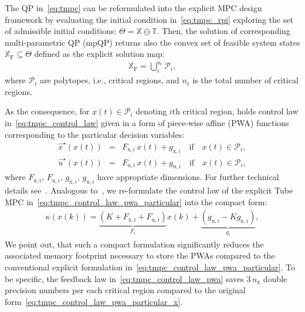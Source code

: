 \documentclass[letterpaper, 10 pt, conference]{ieeeconf}
\begin{document}
The QP in~\eqref{eq:tmpc} can be reformulated into the explicit MPC design framework by evaluating the initial condition in~\eqref{eq:tmpc_rpi} exploring the set of admissible initial conditions: $\Theta = \mathbb{X} \ominus \mathbb{T}$. Then, the solution of corresponding multi-parametric QP (mpQP) returns also the convex set of feasible system states $\mathbb{X}_{\mathrm{F}} \subseteq \Theta$ defined as the explicit solution map:
\begin{eqnarray}
	\label{eq:tmpc_partition}
	\mathbb{X}_{\mathrm{F}} = \bigcup_{i}^{n_{\mathrm{r}}} \mathcal{P}_{i} ,
\end{eqnarray}
where $\mathcal{P}_{i}$ are polytopes, i.e., critical regions, and $n_{\mathrm{r}}$ is the total number of critical regions.

As the consequence, for $x(t) \in \mathcal{P}_{i}$ denoting $i$th critical region, holds control law in~\eqref{eq:tmpc_control_law} given in a form of
piece-wise affine (PWA) functions corresponding to the particular decision variables:
\begin{subequations}
	\label{eq:tmpc_control_law_pwa_particular}
	\begin{eqnarray}
		\label{eq:tmpc_control_law_pwa_particular_x}
		\hat{x}^{\star}(x(t)) \!\!\!\!&=&\!\!\!\! F_{\mathrm{x},i} \, x(t) + g_{\mathrm{x},i} \quad \text{if} \quad x(t) \in \mathcal{P}_{i}, \\
		\label{eq:tmpc_control_law_pwa_particular_u}
		\hat{u}^{\star}(x(t)) \!\!\!\!&=&\!\!\!\! F_{\mathrm{u},i} \, x(t) + g_{\mathrm{u},i} \quad \text{if} \quad x(t) \in \mathcal{P}_{i},
	\end{eqnarray}
\end{subequations}
where $F_{\mathrm{x},i}$, $F_{\mathrm{u},i}$, $g_{\mathrm{x},i}$, $g_{\mathrm{u},i}$ have appropriate dimensions. For further technical details see~\cite{BM02}. 
Analogous to~\cite{ZT14}, we re-formulate the control law of the explicit Tube MPC in~\eqref{eq:tmpc_control_law_pwa_particular} into the compact form:
\begin{eqnarray}
	\label{eq:tmpc_control_law_pwa}
	\kappa(x(k)) = \underbrace{ \left( K + F_{\mathrm{x},i} + F_{\mathrm{u},i} \right) }_{ F_{i} } x(k) + \underbrace{ \left( g_{\mathrm{u},i} - K g_{\mathrm{x},i} \right) }_{ g_{i} } ,
\end{eqnarray}
We point out, that such a compact formulation significantly reduces the associated memory footprint necessary to store the PWAs compared to the conventional explicit formulation in~\eqref{eq:tmpc_control_law_pwa_particular}.  
%
To be specific, the feedback law in~\eqref{eq:tmpc_control_law_pwa} saves $3\,n_\text{x}$ double precision numbers per each critical region compared to the original form~\eqref{eq:tmpc_control_law_pwa_particular_x}.
%
\end{document}
